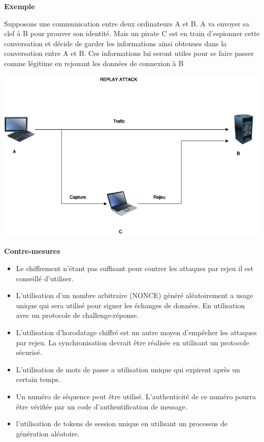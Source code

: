 \bigskip

\begin{flushleft}
\textbf{Exemple}
\end{flushleft}

\smallskip

\begin{flushleft}
Supposons une communication entre deux ordinateurs A et B. A va envoyer sa clef à B pour prouver son identité. Mais un pirate C est en train d'espionner cette conversation et décide de garder les informations ainsi obtenues dans la conversation entre A et B. Ces informations lui seront utiles pour se faire passer comme légitime en rejouant les données de connexion à B
\end{flushleft}

\smallskip

\begin{center}
\includegraphics[scale=0.3]{Network/assets/rejeu.png}
\end{center}

\bigskip


\begin{flushleft}
\textbf{Contre-mesures}
\end{flushleft}

\smallskip

\begin{itemize}
\item Le chiffrement n'étant pas suffisant pour contrer les attaques par rejeu il est
conseillé d'utiliser.
\item L'utilisation d'un nombre arbitraire (NONCE) généré aléatoirement a usage
unique qui sera utilisé pour signer les échanges de données. En utilisation avec
un protocole de challenge-réponse.
\item L'utilisation d'horodatage chiffré est un autre moyen d’empêcher les
attaques par rejeu. La synchronisation devrait être réalisée en utilisant un
protocole sécurisé.
\item L'utilisation de mots de passe a utilisation unique qui expirent après un
certain temps.
\item Un numéro de séquence peut être utilisé. L'authenticité de ce numéro pourra
être vérifiée par un code d'authentification de message.
\item l'utilisation de tokens de session unique en utilisant un processus de
génération aléatoire.
\end{itemize}

